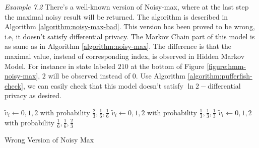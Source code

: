 \textit{Example 7.2} There's a well-known version of Noisy-max, where at the last step the maximal
noisy result will be returned. The algorithm is described in Algorithm \ref{algorithm:noisy-max-bad}.
This version has been proved to be wrong, i.e, it doesn't satisfy differential privacy.
The Markov Chain part of this model is as same as in Algorithm \ref{algorithm:noisy-max}.
The difference is that the maximal value, instead of corresponding index, is observed in Hidden Markov
Model. For instance in state labeled $210$ at the bottom of Figure \ref{figure:hmm-noisy-max},
$2$ will be observed instead of $0$. Use Algorithm \ref{algorithm:pufferfish-check}, we can easily
check that this model doesn't satisfy $\ln 2-$differential privacy as desired.
\begin{algorithm}
  \begin{algorithmic}[1]
                {$\tilde{v}_i \leftarrow 0, 1, 2$ with probability
                 $\frac{2}{3}, \frac{1}{6}, \frac{1}{6}$}
                {$\tilde{v}_i \leftarrow 0, 1, 2$ with probability
                 $\frac{1}{3}, \frac{1}{3}, \frac{1}{3}$}
                {$\tilde{v}_i \leftarrow 0, 1, 2$ with probability
                 $\frac{1}{6}, \frac{1}{6}, \frac{2}{3}$}
        \EndMatch
      \EndFor
    \EndFunction
  \end{algorithmic}
  \caption{Wrong Version of Noisy Max}
  \label{algorithm:noisy-max-bad}
\end{algorithm}
